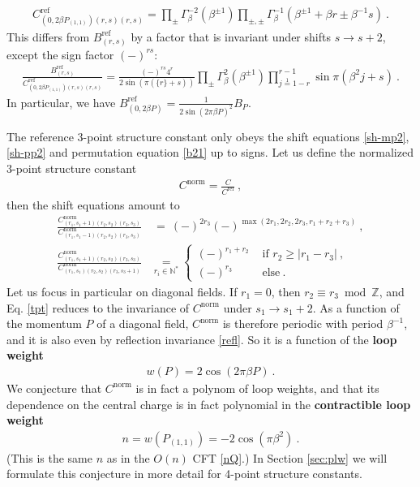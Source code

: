 \documentclass[12pt, a4paper]{article}
\newcommand{\myindex}[1]{\textbf{\boldmath #1}}
\theoremstyle{break}
\begin{document}
 \begin{align}
  C^\text{ref}_{(0,2\beta P_{(1,1)})(r,s)(r,s)} =  \prod_\pm \Gamma_\beta^{-2}\left(\beta^{\pm 1}\right)\prod_{\pm,\pm}\Gamma_\beta^{-1}\left(\beta^{\pm 1}+\beta r \pm \beta^{-1}s\right)  \ .
  \label{cref0}
 \end{align}
This differs from $B^\text{ref}_{(r,s)}$ by a factor that is invariant under shifts $s\to s+2$, except the sign factor $(-)^{rs}$:
 \begin{align}
  \frac{B^\text{ref}_{(r,s)}}{C^\text{ref}_{(0,2\beta P_{(1,1)})(r,s)(r,s)}} = 
  \frac{(-)^{rs} 4^r}{2\sin\left(\pi(\{r\}+s)\right)}
  \prod_\pm \Gamma_\beta^{2}(\beta^{\pm 1})
  \prod_{j\overset{1}{=}1-r}^{r-1} \sin\pi(\beta^2j+s) \ .
 \end{align}
In particular, we have $B^\text{ref}_{(0,2\beta P)} = \frac{1}{2\sin(2\pi\beta P)^2}B_P$.

The reference 3-point structure constant only obeys the shift equations \eqref{sh-mp2}, \eqref{sh-pp2} and permutation equation \eqref{b21} up to signs. Let us define the normalized 3-point structure constant 
\begin{align}
 C^\text{norm} = \frac{C}{C^\text{ref}}\ , 
\end{align}
then the shift equations amount to \cite{nrj23}
\begin{align}
 \frac{C^\text{norm}_{(r_1,s_1+1)(r_2,s_2)(r_3,s_3)}}{C^\text{norm}_{(r_1,s_1-1)(r_2,s_2)(r_3,s_3)}} &\ =\  (-)^{2r_3}(-)^{\max(2r_1, 2r_2, 2r_3,r_1+r_2+r_3)} \ ,
 \label{tpt}
 \\
 \frac{C^\text{norm}_{(r_1,s_1+1)(r_2,s_2)(r_3,s_3)}}{C^\text{norm}_{(r_1,s_1)(r_2,s_2)(r_3,s_3+1)}} &\underset{r_i\in\mathbb{N}^*}{=} 
 \left\{\begin{array}{ll} (-)^{r_1+r_2} &\text{ if } r_2\geq |r_1-r_3|\ ,
                        \\ (-)^{r_3} &\text{ else}\ .
                       \end{array}\right. 
\label{tppt}
\end{align}
Let us focus in particular on diagonal fields. If $r_1=0$, then $r_2\equiv r_3\bmod\mathbb{Z}$, and Eq. \eqref{tpt} reduces to the invariance of $C^\text{norm}$ under $s_1\to s_1+2$. As a function of the momentum $P$ of a diagonal field, $C^\text{norm}$ is therefore periodic with period $\beta^{-1}$, and it is also even by reflection invariance \eqref{refl}. So it is a function of the \myindex{loop weight}
\begin{align}
 \boxed{w(P) = 2\cos(2\pi\beta P)}\ .
 \label{wP}
\end{align}
We conjecture that $C^\text{norm}$ is in fact a polynom of loop weights, and that its dependence on the central charge is in fact polynomial in the \myindex{contractible loop weight}
\begin{align}
 \boxed{n= w\left(P_{(1,1)}\right) = -2\cos(\pi \beta^2)} \ .
 \label{ncb}
\end{align}
(This is the same $n$ as in the $O(n)$ CFT \eqref{nQ}.) In Section \ref{sec:plw} we will formulate this conjecture in more detail for 4-point structure constants. 
\end{document}
